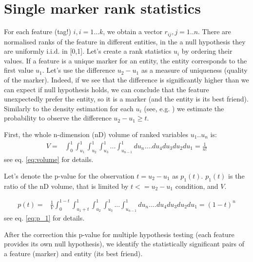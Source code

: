\documentclass{llncs}
\begin{document}
\section{Single marker rank statistics}




For each feature (tag!) $i,i=1\dots k$, we obtain a vector $r_{ij}, j=1..n$. There are normalised ranks of the feature in different entities, in the a null hypothesis they are uniformly i.i.d. in [0,1]. Let's create a rank statistics $u_i$ by ordering their values. If a feature is a unique marker for an entity, the entity corresponds to the first  value $u_1$. Let's use the difference $u_2-u_1$ as a measure of uniqueness (quality of the marker). Indeed, if we see that the difference is significantly higher than we can expect if null hypothesis holds, we can conclude that the feature unexpectedly prefer the entity, so it is a marker (and the entity is its best friend). Similarly to the density estimation for each $u_i$ (see, e.g. \cite{Gut:2009}) we estimate the probability to observe the difference $u_2 - u_1 \ge t$. 

First, the whole n-dimension (nD) volume of ranked variables $u_1 .. u_n$ is:
\begin{eqnarray*}
V = &\displaystyle \int_0^1\int_{u_1}^1\int_{u_2}^1\int_{u_3}^1...\int_{u_{n-1}}^1 du_n....du_4 du_3 du_2 du_1 =  \frac{1}{n!}
\end{eqnarray*}
see eq. \ref{eq:volume} for details.

Let's denote the p-value for the observation $t=u_2-u_1$ as $p_1(t)$. $p_1(t)$ is the ratio of the nD volume, that is limited by $t<=u_2-u_1$ condition, and $V$.

\begin{eqnarray*}
p(t) = & \displaystyle\frac{1}{V} \displaystyle \int_0^{1-t}\int_{{u_1}+t}^1\int_{u_2}^1\int_{u_3}^1...\int_{u_{n-1}}^1 du_n....du_4 du_3 du_2 du_1 = (1-t)^n
\end{eqnarray*}
see eq. \ref{eq:p_1} for details.

After the correction this p-value for multiple hypothesis testing (each feature provides its own null hypothesis), we identify the statistically significant pairs of a feature (marker) and entity (its best friend).
\end{document}
